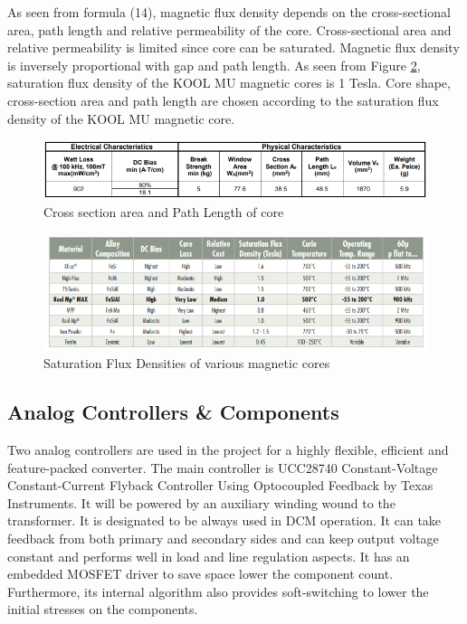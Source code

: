 As seen from formula (14), magnetic flux density depends on the cross-sectional area, path length and relative permeability of the core. Cross-sectional area and relative permeability is limited since core can be saturated. Magnetic flux density is inversely proportional with gap and path length. As seen from Figure \ref{fig:SFD}, saturation flux density of the KOOL MU magnetic cores is 1 Tesla. Core shape, cross-section area and path length are chosen according to the saturation flux density of the KOOL MU magnetic core.

\begin{figure}[!h]
\centering
\includegraphics [width=1\textwidth]{area vs.png}
\caption{Cross section area and Path Length of core }
\label{fig:Csa}
\end{figure}
\begin{figure}[H]
\centering
\includegraphics [width=1\textwidth]{permeability.png}
\caption{Saturation Flux Densities of various magnetic cores }
\label{fig:SFD}
\end{figure}
\subsection{Analog Controllers & Components}

Two analog controllers are used in the project for a highly flexible, efficient and feature-packed converter. The main controller is  UCC28740 Constant-Voltage Constant-Current Flyback Controller
Using Optocoupled Feedback by Texas Instruments. It will be powered by an auxiliary winding wound to the transformer. It is designated to be always used in DCM operation. It can take feedback from both primary and secondary sides and can keep output voltage constant and performs well in load and line regulation aspects. It has an embedded MOSFET driver to save space lower the component count. Furthermore, its internal algorithm also provides soft-switching to lower the initial stresses on the components.

